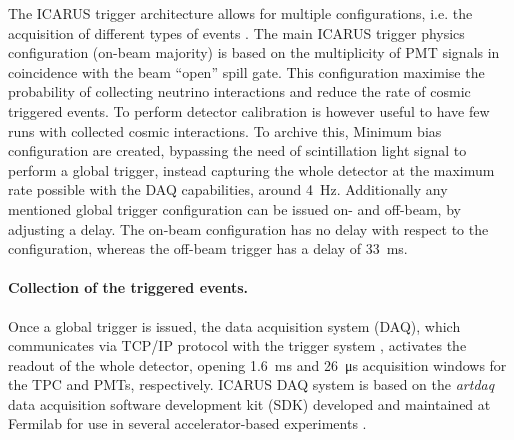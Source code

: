 The ICARUS trigger architecture allows for multiple configurations, i.e. the acquisition of different types of events \cite{ICARUS:2025kai}. The main ICARUS trigger physics configuration (on-beam majority) is based on the multiplicity of PMT signals in coincidence with the beam ``open'' spill gate. This configuration maximise the probability of collecting neutrino interactions and reduce the rate of cosmic triggered events. To perform detector calibration is however useful to have few runs with collected cosmic interactions. To archive this, Minimum bias configuration are created, bypassing the need of scintillation light signal to perform a global trigger, instead capturing the whole detector at the maximum rate possible with the DAQ capabilities, around \SI{4}{\hertz}. Additionally any mentioned global trigger configuration can be issued on- and off-beam, by adjusting a delay. The on-beam configuration has no delay with respect to the configuration, whereas the off-beam trigger has a delay of \SI{+33}{\ms}. 

\paragraph{Collection of the triggered events. } Once a global trigger is issued, the data acquisition system (DAQ), which communicates via TCP/IP protocol with the trigger system \cite{ICARUS:2025kai}, activates the readout of the whole detector, opening \SI{1.6}{\ms} and \SI{26}{\us} acquisition windows for the TPC and PMTs, respectively. ICARUS DAQ system is based on the \emph{artdaq} data acquisition software development kit (SDK) developed and maintained at Fermilab for use in several accelerator-based experiments \cite{Biery:2013cda}.  


